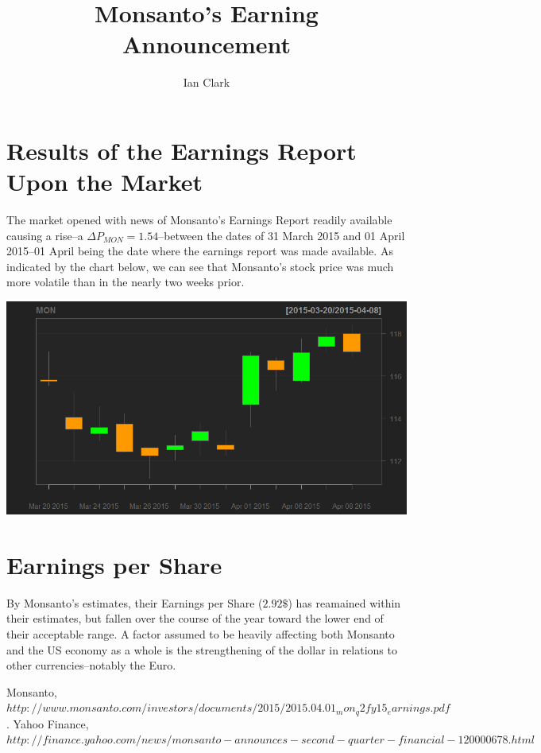 \documentclass[11pt,letterpaper,english]{article}
\title{Monsanto's Earning Announcement}
\author{Ian Clark}
\date{}
\begin{document}
\maketitle

\section{Results of the Earnings Report Upon the Market} 
The market opened with news of Monsanto's Earnings Report readily available causing a rise--a $\Delta{P_{MON}} = 1.54 $--between the dates of 31 March 2015 and 01 April 2015--01 April being the date where the earnings report was made available. As indicated by the chart below, we can see that Monsanto's stock price was much more volatile than in the nearly two weeks prior.

\begin{center}
\includegraphics[scale=0.5]{Data/CandleChart.png}
\end{center}

\section{Earnings per Share}
By Monsanto's estimates, their Earnings per Share ($2.92 \$ $) has reamained within their estimates, but fallen over the course of the year toward the lower end of their acceptable range. A factor assumed to be heavily affecting both Monsanto and the US economy as a whole is the strengthening of the dollar in relations to other currencies--notably the Euro.

\vspace{0.5mm}
\noindent


\newpage
\begin{thebibliography}{9}
    Monsanto,
    \emph{$http://www.monsanto.com/investors/documents/2015/2015.04.01_mon_q2fy15_earnings.pdf$}.
     Yahoo Finance,
     \emph{$http://finance.yahoo.com/news/monsanto-announces-second-quarter-financial-120000678.html$}
\end{thebibliography}
\end{document}
